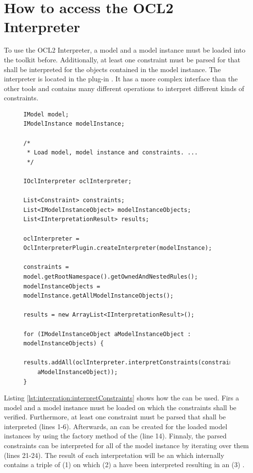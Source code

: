 \section{How to access the OCL2 Interpreter}

To use the \acs{OCL}2 Interpreter, a model and a model instance must be loaded into the toolkit before. Additionally, at least one constraint must be parsed for that shall be interpreted for the objects contained in the model instance. The interpreter is located in the plug-in . It has a more complex interface than the other tools and contains many different operations to interpret different kinds of constraints.

\begin{figure}[!b]
\begin{lstlisting}[caption={How to interpret constraints.}, captionpos=b, label=lst:integration:interpretConstraints]
IModel model;
IModelInstance modelInstance;

/*
 * Load model, model instance and constraints. ...
 */

IOclInterpreter oclInterpreter;

List<Constraint> constraints;
List<IModelInstanceObject> modelInstanceObjects;
List<IInterpretationResult> results;

oclInterpreter = OclInterpreterPlugin.createInterpreter(modelInstance);

constraints = model.getRootNamespace().getOwnedAndNestedRules();
modelInstanceObjects = modelInstance.getAllModelInstanceObjects();

results = new ArrayList<IInterpretationResult>();

for (IModelInstanceObject aModelInstanceObject : modelInstanceObjects) {
  results.addAll(oclInterpreter.interpretConstraints(constraints,
  	aModelInstanceObject));
}
\end{lstlisting}
\end{figure}

Listing \ref{lst:integration:interpretConstraints} shows how the  can be used. Firs a model and a model instance must be loaded on which the constraints shall be verified. Furthermore, at least one constraint must be parsed that shall be interpreted (lines 1-6). Afterwards, an  can be created for the loaded model instances by using the factory method of the  (line 14). Finnaly, the parsed constraints can be interpreted for all  of the model instance by iterating over them (lines 21-24). The result of each interpretation will be an  which internally contains a triple of (1)  on which (2) a  have been interpreted resulting in an (3) .